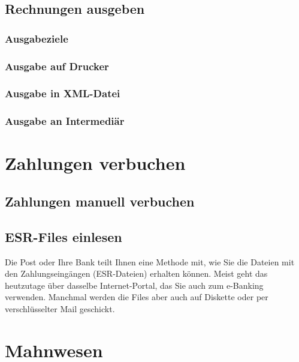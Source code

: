\documentclass[a4paper]{scrartcl}
\begin{document}
\subsection{Rechnungen ausgeben}

\subsubsection{Ausgabeziele}

\subsubsection{Ausgabe auf Drucker}

\subsubsection{Ausgabe in XML-Datei}

\subsubsection{Ausgabe an Intermediär}

\section{Zahlungen verbuchen}

\subsection{Zahlungen manuell verbuchen}

\subsection{ESR-Files einlesen}
Die Post oder Ihre Bank teilt Ihnen eine Methode mit, wie Sie die Dateien mit den Zahlungseingängen (ESR-Dateien) erhalten können. Meist geht das heutzutage über dasselbe Internet-Portal, das Sie auch zum e-Banking verwenden. Manchmal werden die Files aber auch auf Diskette oder per verschlüsselter Mail geschickt.

\section{Mahnwesen}
\end{document}
